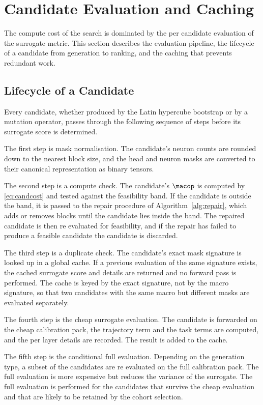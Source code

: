 \section{Candidate Evaluation and Caching}
\label{chap:eval}

The compute cost of the search is dominated by the per candidate evaluation of the surrogate metric. This section describes the evaluation pipeline, the lifecycle of a candidate from generation to ranking, and the caching that prevents redundant work.

\subsection{Lifecycle of a Candidate}

Every candidate, whether produced by the Latin hypercube bootstrap or by a mutation operator, passes through the following sequence of steps before its surrogate score is determined.

The first step is mask normalisation. The candidate's neuron counts are rounded down to the nearest block size, and the head and neuron masks are converted to their canonical representation as binary tensors.

The second step is a compute check. The candidate's $\macop$ is computed by \eqref{eq:candcost} and tested against the feasibility band. If the candidate is outside the band, it is passed to the repair procedure of Algorithm~\ref{alg:repair}, which adds or removes blocks until the candidate lies inside the band. The repaired candidate is then re evaluated for feasibility, and if the repair has failed to produce a feasible candidate the candidate is discarded.

The third step is a duplicate check. The candidate's exact mask signature is looked up in a global cache. If a previous evaluation of the same signature exists, the cached surrogate score and details are returned and no forward pass is performed. The cache is keyed by the exact signature, not by the macro signature, so that two candidates with the same macro but different masks are evaluated separately.

The fourth step is the cheap surrogate evaluation. The candidate is forwarded on the cheap calibration pack, the trajectory term and the task terms are computed, and the per layer details are recorded. The result is added to the cache.

The fifth step is the conditional full evaluation. Depending on the generation type, a subset of the candidates are re evaluated on the full calibration pack. The full evaluation is more expensive but reduces the variance of the surrogate. The full evaluation is performed for the candidates that survive the cheap evaluation and that are likely to be retained by the cohort selection.

